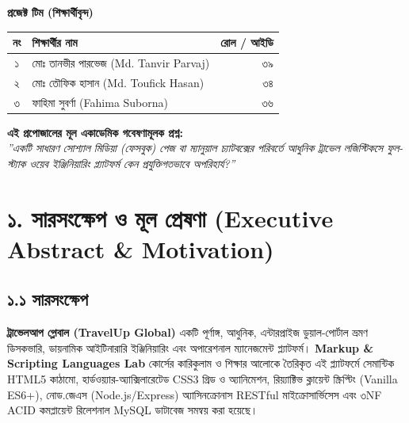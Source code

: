 \documentclass[11pt,a4paper]{article}
\begin{document}
\begin{titlepage}
    {\bfseries\textcolor{secondary}{\large প্রজেক্ট টিম (শিক্ষার্থীবৃন্দ)}}\\[0.15cm]
    \renewcommand{\arraystretch}{1.25}
    \begin{tabularx}{\textwidth}{c X r}
        \toprule
        \textbf{নং} & \textbf{শিক্ষার্থীর নাম} & \textbf{রোল / আইডি} \\
        \midrule
        ১ & মোঃ তানভীর পারভেজ (Md. Tanvir Parvaj) & ৩৯ \\
        ২ & মোঃ তৌফিক হাসান (Md. Toufick Hasan) & ৩৪ \\
        ৩ & ফাহিমা সুবর্ণা (Fahima Suborna)       & ৩৬ \\
        \bottomrule
    \end{tabularx}
    
    \vfill
    \begin{tcolorbox}[colback=boxgray,colframe=primary,arc=2mm,boxrule=0.8pt]
    \centering\footnotesize\textcolor{secondary}{
    \textbf{এই প্রপোজালের মূল একাডেমিক গবেষণামূলক প্রশ্ন:}\\
    \textit{''একটি সাধারণ সোশ্যাল মিডিয়া (ফেসবুক) পেজ বা ম্যানুয়াল চ্যাটবক্সের পরিবর্তে আধুনিক ট্রাভেল লজিস্টিকসে ফুল-স্ট্যাক ওয়েব ইঞ্জিনিয়ারিং প্ল্যাটফর্ম কেন প্রযুক্তিগতভাবে অপরিহার্য?''}
    }
    \end{tcolorbox}
    \vspace*{0.1cm}
\end{titlepage}

\newpage

\section{১. সারসংক্ষেপ ও মূল প্রেষণা (Executive Abstract \& Motivation)}

\subsection{১.১ সারসংক্ষেপ}
\textbf{ট্রাভেলআপ গ্লোবাল (TravelUp Global)} একটি পূর্ণাঙ্গ, আধুনিক, এন্টারপ্রাইজ ডুয়াল-পোর্টাল ভ্রমণ ডিসকভারি, ডায়নামিক আইটিনারারি ইঞ্জিনিয়ারিং এবং অপারেশনাল ম্যানেজমেন্ট প্ল্যাটফর্ম। \textbf{Markup \& Scripting Languages Lab} কোর্সের কারিকুলাম ও শিক্ষার আলোকে তৈরিকৃত এই প্ল্যাটফর্মে সেমান্টিক HTML5 কাঠামো, হার্ডওয়্যার-অ্যাক্সিলারেটেড CSS3 গ্রিড ও অ্যানিমেশন, রিয়্যাক্টিভ ক্লায়েন্ট স্ক্রিপ্টিং (Vanilla ES6+), নোড.জেএস (Node.js/Express) অ্যাসিনক্রোনাস RESTful মাইক্রোসার্ভিসেস এবং ৩NF ACID কমপ্লায়েন্ট রিলেশনাল MySQL ডাটাবেজ সমন্বয় করা হয়েছে।
\end{document}
